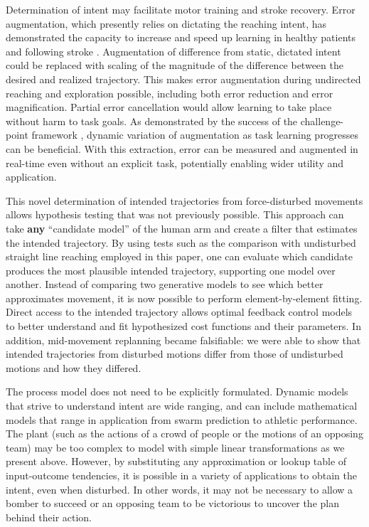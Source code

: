 \documentclass[10pt]{article}
\begin{document}
Determination of intent may facilitate motor training and stroke recovery. Error augmentation, which presently relies on dictating the reaching intent, has demonstrated the capacity to increase and speed up learning in healthy patients \cite{patton2004robot} and following stroke \cite{patton2006evaluation}. Augmentation of difference from static, dictated intent could be replaced with scaling of the magnitude of the difference between the desired and realized trajectory. This makes error augmentation during undirected reaching and exploration possible, including both error reduction and error magnification. Partial error cancellation would allow learning to take place without harm to task goals. As demonstrated by the success of the challenge-point framework \cite{guadagnoli2004challenge}, dynamic variation of augmentation as task learning progresses can be beneficial. With this extraction, error can be measured and augmented in real-time even without an explicit task, potentially enabling wider utility and application. 

This novel determination of intended trajectories from force-disturbed movements allows hypothesis testing that was not previously possible. This approach can take \textbf{any} ``candidate model'' of the human arm and create a filter that estimates the intended trajectory. By using tests such as the comparison with undisturbed straight line reaching employed in this paper, one can evaluate which candidate produces the most plausible intended trajectory, supporting one model over another.  Instead of comparing two generative models to see which better approximates movement, it is now possible to perform element-by-element fitting. Direct access to the intended trajectory allows optimal feedback control models to better understand and fit hypothesized cost functions and their parameters. In addition, mid-movement replanning became falsifiable: we were able to show that intended trajectories from disturbed motions differ from those of undisturbed motions and how they differed.

The process model does not need to be explicitly formulated. Dynamic models that strive to understand intent are wide ranging, and can include mathematical models that range in application from swarm prediction to athletic performance. The plant (such as the actions of a crowd of people or the motions of an opposing team) may be too complex to model with simple linear transformations as we present above. However, by substituting any approximation or lookup table of input-outcome tendencies, it is possible in a variety of applications to obtain the intent, even when disturbed. In other words, it may not be necessary to allow a bomber to succeed or an opposing team to be victorious to uncover the plan behind their action.
\end{document}
